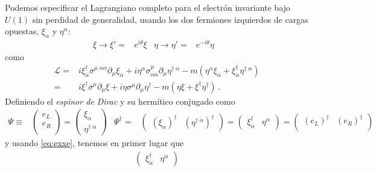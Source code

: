 \begin{frame}
Podemos especificar el Lagrangiano completo para el electrón invariante bajo $U(1)$ sin perdidad de generalidad, usando los dos fermiones izquierdos de cargas opuestas, $\xi_{\alpha}$ y $\eta^{\alpha}$:
\begin{align}
  \xi\to\xi'=&e^{i\theta}\xi &   \eta\to\eta'=&e^{-i\theta}\eta &
\end{align}
como
\begin{align}
\label{eq:dwlag}
  \mathcal{L}=&i\xi^{\dagger}_{\dot{\alpha}}\overline{\sigma}^{\mu\;\dot{\alpha}\alpha}\partial_{\mu}\xi_{\alpha}+i\eta^{\alpha}\sigma^{\mu}_{\alpha\dot{\alpha}}\partial_{\mu}\eta^{\dagger\;\dot{\alpha}}
-m \left(\eta^{\alpha} \xi_{\alpha}+\xi^{\dagger}_{\dot{\alpha}} \eta^{\dagger\;\dot{\alpha}}\right)\nonumber\\
=&i\xi^{\dagger}\overline{\sigma}^{\mu}\partial_{\mu}\xi+i\eta\sigma^{\mu}\partial_{\mu}\eta^{\dagger}
-m \left(\eta\xi+\xi^{\dagger}\eta^{\dagger} \right)\,.
\end{align}
Definiendo el \emph{espinor de Dirac}  y su hermítico conjugado como
\begin{align}
\label{eq:psid}
  \Psi\equiv&  \begin{pmatrix}
   e_L\\
   e_R\\    
  \end{pmatrix}=
  \begin{pmatrix}
   \xi_{\alpha}\\
   \eta^{\dagger\;\dot{\alpha}}    
  \end{pmatrix}&  \Psi^{\dagger}=&
  \begin{pmatrix}
   \left( \xi_{\alpha} \right)^{\dagger} & \left( \eta^{\dagger\;\dot{\alpha}} \right)^{\dagger}    
  \end{pmatrix}=  \begin{pmatrix}
  \xi^{\dagger}_{\dot{\alpha}}& \eta^{\alpha}
\end{pmatrix}
= \begin{pmatrix}                                
\left(e_L\right)^\dagger   & \left(e_R\right)^\dagger \\
  \end{pmatrix}                                
\end{align}
y usando \eqref{eq:exxe}, tenemos en primer lugar que
\begin{align}
\label{eq:psidm}
  \begin{pmatrix}
  \xi^{\dagger}_{\dot{\alpha}}& \eta^{\alpha}

\end{pmatrix}
\end{align}
\end{frame}
